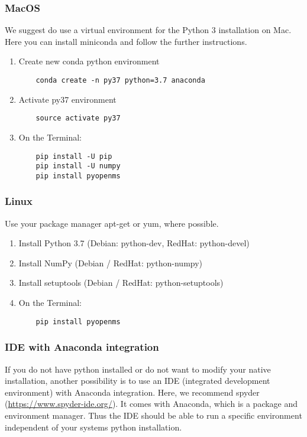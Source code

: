 {\subsubsection{MacOS}
We suggest do use a virtual environment for the Python 3 installation on Mac. 
Here you can install miniconda and follow the further instructions. \\

\begin{enumerate}
  \item Create new conda python environment
    \begin{lstlisting}
    conda create -n py37 python=3.7 anaconda
    \end{lstlisting} 
    \item Activate py37 environment
    \begin{lstlisting}
    source activate py37
    \end{lstlisting} 
  \item On the Terminal:
    \begin{lstlisting}
    pip install -U pip
    pip install -U numpy
    pip install pyopenms
    \end{lstlisting}
\end{enumerate}

\subsubsection{Linux}
Use your package manager apt-get or yum, where possible.
\begin{enumerate}
  \item Install Python 3.7 (Debian: python-dev, RedHat: python-devel)
  \item Install NumPy (Debian / RedHat: python-numpy)
  \item Install setuptools (Debian / RedHat: python-setuptools)
  \item On the Terminal:
    \begin{lstlisting}
    pip install pyopenms
    \end{lstlisting}
\end{enumerate}

\subsubsection{IDE with Anaconda integration}
If you do not have python installed or do not want to modify your native installation, another possibility is to use an IDE (integrated development environment) with Anaconda integration. Here, we recommend spyder (\url{https://www.spyder-ide.org/}). It comes with Anaconda, which is a package and environment manager. Thus the IDE should be able to run a specific environment independent of your systems python installation. \\

}
